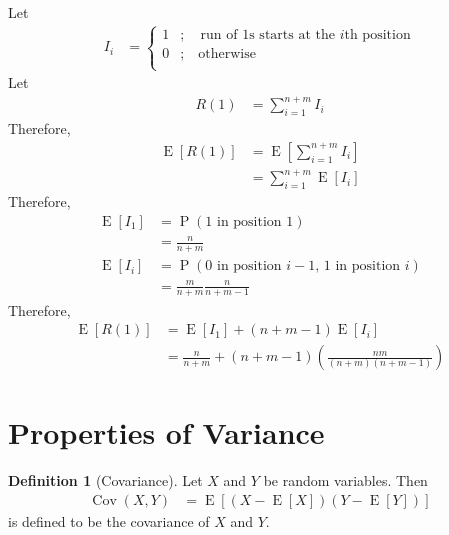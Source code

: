 \documentclass[titlepage, fleqn, a4paper, 12pt, twoside]{article}
\theoremstyle{definition}
\newtheorem{definition}{Definition}
\theoremstyle{theorem}
\DeclareMathOperator{\prob}{\mathrm{P}}
\DeclareMathOperator{\expct}{\mathrm{E}}
\DeclareMathOperator{\cov}{\mathrm{Cov}}
\begin{document}
\begin{solution}
	Let
	\begin{align*}
		I_i               & =
			\begin{cases}
				1 & ;\quad \text{run of $1$s starts at the $i$th position} \\
				0 & ;\quad \text{otherwise}                                \\
			\end{cases}
	\end{align*}
	Let
	\begin{align*}
		R(1) & = \sum\limits_{i = 1}^{n + m} I_i
	\end{align*}
	Therefore,
	\begin{align*}
		\expct\left[ R(1) \right] & = \expct\left[ \sum\limits_{i = 1}^{n + m} I_i \right] \\
                                          & = \sum\limits_{i = 1}^{n + m} \expct[I_i]
	\end{align*}
	Therefore,
	\begin{align*}
		\expct[I_1] & = \prob(\text{$1$ in position $1$})                          \\
                            & = \frac{n}{n + m}                                            \\
		\expct[I_i] & = \prob(\text{$0$ in position $i - 1$, $1$ in position $i$}) \\
                            & = \frac{m}{n + m} \frac{n}{n + m - 1}
	\end{align*}
	Therefore,
	\begin{align*}
		\expct\left[ R(1) \right] & = \expct[I_1] + (n + m - 1) \expct[I_i] \\
                                          & = \frac{n}{n + m} + (n + m - 1) \left( \frac{n m}{(n + m) (n + m - 1)} \right)
	\end{align*}
\end{solution}

\section{Properties of Variance}

\begin{definition}[Covariance]
	Let $X$ and $Y$ be random variables.
	Then
	\begin{align*}
		\cov(X,Y) & = \expct\left[ \left( X - \expct[X] \right) \left( Y - \expct[Y] \right) \right]
	\end{align*}
	is defined to be the covariance of $X$ and $Y$.
\end{definition}
\end{document}
